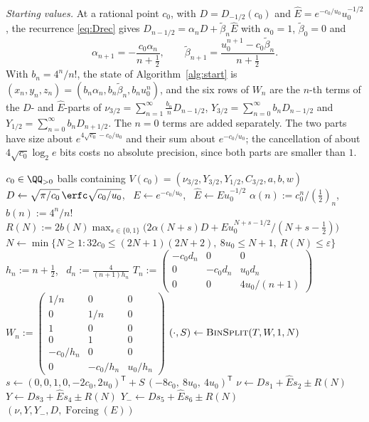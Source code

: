 \emph{Starting values.} At a rational point $c_0$, with $D = D_{-1/2}(c_0)$ and $\hat E = e^{-c_0/u_0}u_0^{-1/2}$,
the recurrence \eqref{eq:Drec} gives $D_{n-1/2} = \alpha_nD + \tilde\beta_n\hat E$ with $\alpha_0 = 1$,
$\tilde\beta_0 = 0$ and
\[
  \alpha_{n+1} = -\frac{c_0\alpha_n}{n+\frac12}, \qquad \tilde\beta_{n+1} = \frac{u_0^{n+1} - c_0\tilde\beta_n}{n+\frac12}.
\]
With $b_n = 4^n/n!$, the state of Algorithm~\ref{alg:start} is $(x_n, y_n, z_n) = (b_n\alpha_n, b_n\tilde\beta_n,
b_nu_0^n)$, and the six rows of $W_n$ are the $n$-th terms of the $D$- and $\hat E$-parts of
$\nu_{3/2} = \sum_{n=1}^{\infty}\frac{b_n}nD_{n-1/2}$, $Y_{3/2} = \sum_{n=0}^{\infty}b_nD_{n-1/2}$ and
$Y_{1/2} = \sum_{n=0}^{\infty}b_nD_{n+1/2}$. The $n = 0$ terms are added separately. The two parts have size about
$e^{4\sqrt{c_0} - c_0/u_0}$ and their sum about $e^{-c_0/u_0}$; the cancellation of about $4\sqrt{c_0}\log_2e$ bits
costs no absolute precision, since both parts are smaller than $1$.

\begin{algorithm}[ht]
\caption{$\textsc{StartValues}(c_0)$}\label{alg:start}
\begin{algorithmic}[1]
\small
\Require $c_0 \in \QQ_{>0}$
\Ensure balls containing $V(c_0) = (\nu_{3/2}, Y_{3/2}, Y_{1/2}, C_{3/2}, a, b, w)$
\State $D \gets \sqrt{\pi/c_0}\,\erfc\sqrt{c_0/u_0}$, \ $E \gets e^{-c_0/u_0}$, \ $\hat E \gets Eu_0^{-1/2}$
\State $\alpha(n) := c_0^n/(\frac12)_n$, \ $b(n) := 4^n/n!$
\State $R(N) := 2b(N)\max_{s\in\{0,1\}}\bigl(2\alpha(N+s)D + Eu_0^{N+s-1/2}/(N+s-\frac12)\bigr)$
\State $N \gets \min\{N \ge 1 : 32c_0 \le (2N+1)(2N+2),\ 8u_0 \le N+1,\ R(N) \le \varepsilon\}$
\State $h_n := n + \frac12$, \ $d_n := \frac{4}{(n+1)h_n}$
\State $T_n := \left(\begin{matrix} -c_0d_n & 0 & 0 \\ 0 & -c_0d_n & u_0d_n \\ 0 & 0 & 4u_0/(n+1)\end{matrix}\right)$
\State $W_n := \left(\begin{matrix} 1/n & 0 & 0 \\ 0 & 1/n & 0 \\ 1 & 0 & 0 \\ 0 & 1 & 0 \\
  -c_0/h_n & 0 & 0 \\ 0 & -c_0/h_n & u_0/h_n\end{matrix}\right)$
\State $(\cdot, S) \gets \textsc{BinSplit}(T, W, 1, N)$
\State $s \gets (0, 0, 1, 0, -2c_0, 2u_0)^{\mathsf T} + S\,(-8c_0,\ 8u_0,\ 4u_0)^{\mathsf T}$
\State $\nu \gets Ds_1 + \hat Es_2 \pm R(N)$
\State $Y \gets Ds_3 + \hat Es_4 \pm R(N)$
\State $Y_- \gets Ds_5 + \hat Es_6 \pm R(N)$
\State \Return $(\nu, Y, Y_-, D, \operatorname{Forcing}(E))$
\end{algorithmic}
\end{algorithm}


